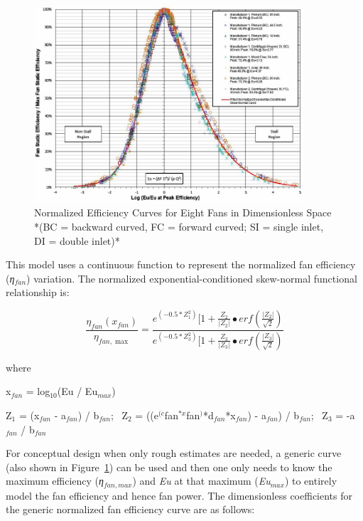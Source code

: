\begin{figure}[hbtp] %
\centering
\includegraphics[width=0.9\textwidth, height=0.9\textheight, keepaspectratio=true]{media/image4895.png}
\caption{Normalized Efficiency Curves for Eight Fans in Dimensionless Space *(BC = backward curved, FC = forward curved; SI = single inlet, DI = double inlet)* \protect \label{fig:normalized-efficiency-curves-for-eight-fans}}
\end{figure}

This model uses a continuous function to represent the normalized fan efficiency (\emph{η\(_{fan}\)}) variation. The normalized exponential-conditioned skew-normal functional relationship is:

\begin{equation}
\frac{{{\eta_{fan}}({x_{fan}})}}{{{\eta_{fan,\max }}}} = \frac{{{e^{( - 0.5*Z_1^2)}}[1 + \frac{{{Z_2}}}{{\left| {{Z_2}} \right|}} \bullet erf\left( {\frac{{\left| {{Z_2}} \right|}}{{\sqrt 2 }}} \right)}}{{{e^{( - 0.5*Z_3^2)}}[1 + \frac{{{Z_3}}}{{\left| {{Z_3}} \right|}} \bullet erf\left( {\frac{{\left| {{Z_3}} \right|}}{{\sqrt 2 }}} \right)}}
\end{equation}

where

x\(_{fan}\) = log\(_{10}\)(Eu / Eu\(_{max}\))

Z\(_{1}\) = (x\(_{fan}\) - a\(_{fan}\)) / b\(_{fan}\);~ Z\(_{2}\) = ((e\(^{(c}\)fan\(^{*x}\)fan\(^{)}\)*d\(_{fan}\)*x\(_{fan}\)) - a\(_{fan}\)) / b\(_{fan}\);~ Z\(_{3}\) = -a\(_{fan}\) / b\(_{fan}\)

For conceptual design when only rough estimates are needed, a generic curve (also shown in Figure~\ref{fig:normalized-efficiency-curves-for-eight-fans}) can be used and then one only needs to know the maximum efficiency (\emph{η\(_{fan,max}\)}) and \emph{Eu} at that maximum (\emph{Eu\(_{max}\)}) to entirely model the fan efficiency and hence fan power. The dimensionless coefficients for the generic normalized fan efficiency curve are as follows:

